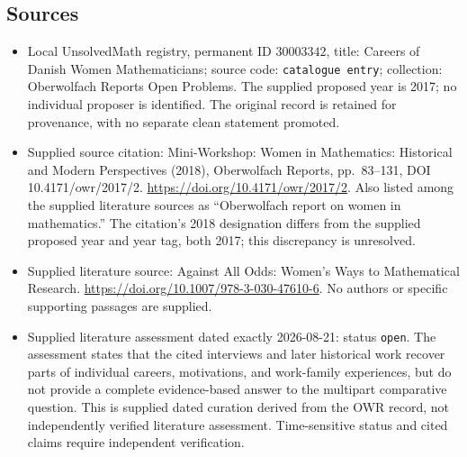 \documentclass[11pt]{article}
\begin{document}
\subsection{Sources}
\begin{itemize}
\item Local UnsolvedMath registry, permanent ID \(30003342\), title: Careers of Danish Women Mathematicians; source code: \texttt{catalogue entry}; collection: Oberwolfach Reports Open Problems. The supplied proposed year is 2017; no individual proposer is identified. The original record is retained for provenance, with no separate clean statement promoted.
\item Supplied source citation: Mini-Workshop: Women in Mathematics: Historical and Modern Perspectives (2018), Oberwolfach Reports, pp.\ 83--131, DOI 10.4171/owr/2017/2. \url{https://doi.org/10.4171/owr/2017/2}. Also listed among the supplied literature sources as ``Oberwolfach report on women in mathematics.'' The citation's 2018 designation differs from the supplied proposed year and year tag, both 2017; this discrepancy is unresolved.
\item Supplied literature source: Against All Odds: Women's Ways to Mathematical Research. \url{https://doi.org/10.1007/978-3-030-47610-6}. No authors or specific supporting passages are supplied.
\item Supplied literature assessment dated exactly 2026-08-21: status \texttt{open}. The assessment states that the cited interviews and later historical work recover parts of individual careers, motivations, and work-family experiences, but do not provide a complete evidence-based answer to the multipart comparative question. This is supplied dated curation derived from the OWR record, not independently verified literature assessment. Time-sensitive status and cited claims require independent verification.
\end{itemize}
\end{document}
